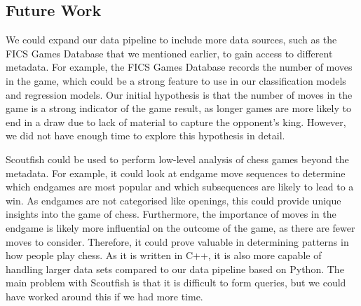 \documentclass[a4paper, 11pt]{article}
\begin{document}
\subsection{Future Work}
We could expand our data pipeline to include more data sources, such as the FICS Games Database that we mentioned earlier, to gain access to different metadata. For example, the FICS Games Database records the number of moves in the game, which could be a strong feature to use in our classification models and regression models. Our initial hypothesis is that the number of moves in the game is a strong indicator of the game result, as longer games are more likely to end in a draw due to lack of material to capture the opponent's king. However, we did not have enough time to explore this hypothesis in detail.

Scoutfish could be used to perform low-level analysis of chess games beyond the metadata. For example, it could look at endgame move sequences to determine which endgames are most popular and which subsequences are likely to lead to a win. As endgames are not categorised like openings, this could provide unique insights into the game of chess. Furthermore, the importance of moves in the endgame is likely more influential on the outcome of the game, as there are fewer moves to consider. Therefore, it could prove valuable in determining patterns in how people play chess. As it is written in C++, it is also more capable of handling larger data sets compared to our data pipeline based on Python. The main problem with Scoutfish is that it is difficult to form queries, but we could have worked around this if we had more time.



\end{document}
